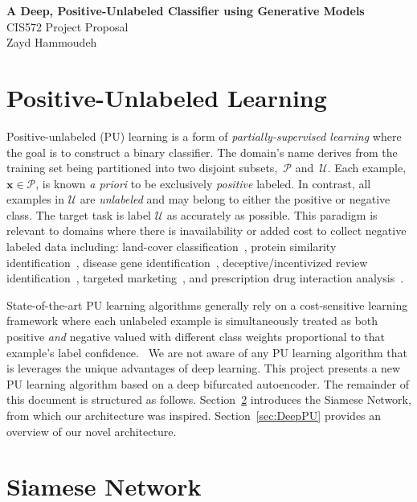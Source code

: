 \documentclass[10pt]{article}
\begin{document}
\suppressfloats%
\begin{center}
  \textbf{\Large \textbf{A Deep, Positive-Unlabeled Classifier using Generative Models}}
  \\\vspace{8pt}
  {\large CIS572 Project Proposal}
  \\\vspace{4pt}
  Zayd Hammoudeh
\end{center}

\section{Positive-Unlabeled Learning}

Positive-unlabeled (PU) learning is a form of \textit{partially-supervised learning}  where the goal is to construct a binary classifier. The domain's name derives from the training set being partitioned into two disjoint subsets,~$\mathcal{P}$ and~$\mathcal{U}$.  Each example, ${\mathbf{x} \in \mathcal{P}}$, is known \textit{a priori} to be exclusively \textit{positive} labeled. In contrast, all examples in $\mathcal{U}$ are \textit{unlabeled} and may belong to either the positive or negative class. The target task is label $\mathcal{U}$ as accurately as possible.  This paradigm is relevant to domains where there is inavailability or added cost to collect negative labeled data including: land-cover classification~\cite{Li:2011}, protein similarity identification~\cite{Elkan:2008}, disease gene identification~\cite{Yang:2012}, deceptive/incentivized review identification~\cite{Ren:2014}, targeted marketing~\cite{Yi:2017}, and prescription drug interaction analysis~\cite{Liu:2017}.

State-of-the-art PU learning algorithms generally rely on a cost-sensitive learning framework where each unlabeled example is simultaneously treated as both positive \textit{and} negative valued with different class weights proportional to that example's label confidence.~\cite{Elkan:2008}  We are not aware of any PU learning algorithm that is leverages the unique advantages of deep learning.  This project presents a new PU learning algorithm based on a deep bifurcated autoencoder.  The remainder of this document is structured as follows.  Section~\ref{sec:Siamese} introduces the Siamese Network, from which our architecture was inspired.  Section~\ref{sec:DeepPU} provides an overview of our novel architecture.

\section{Siamese Network}\label{sec:Siamese}
\end{document}
